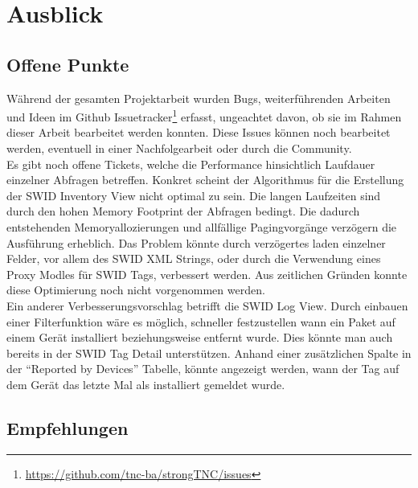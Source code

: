 \chapter{Ausblick}

\section{Offene Punkte} 
Während der gesamten Projektarbeit wurden Bugs, weiterführenden Arbeiten und
Ideen im Github
Issuetracker\footnote{\url{https://github.com/tnc-ba/strongTNC/issues}} erfasst,
ungeachtet davon, ob sie im Rahmen dieser Arbeit bearbeitet werden konnten.
Diese Issues können noch bearbeitet werden, eventuell in einer Nachfolgearbeit
oder durch die Community.\\
Es gibt noch offene Tickets, welche die Performance hinsichtlich Laufdauer
einzelner Abfragen betreffen. Konkret scheint der Algorithmus für die Erstellung
der SWID Inventory View nicht optimal zu sein. Die langen Laufzeiten sind durch
den hohen Memory Footprint der Abfragen bedingt. Die dadurch entstehenden
Memoryallozierungen und allfällige Pagingvorgänge verzögern die Ausführung
erheblich. Das Problem könnte durch verzögertes laden einzelner Felder, vor
allem des SWID XML Strings, oder durch die Verwendung eines Proxy Modles für
SWID Tags, verbessert werden. Aus zeitlichen Gründen konnte diese Optimierung
noch nicht vorgenommen werden.\\
Ein anderer Verbesserungsvorschlag betrifft die SWID Log View. Durch einbauen
einer Filterfunktion wäre es möglich, schneller festzustellen wann ein Paket auf
einem Gerät installiert beziehungsweise entfernt wurde. Dies könnte man auch
bereits in der SWID Tag Detail unterstützen. Anhand einer zusätzlichen Spalte in
der \enquote{Reported by Devices} Tabelle, könnte angezeigt werden, wann der Tag
auf dem Gerät das letzte Mal als installiert gemeldet wurde.


\section{Empfehlungen} 

